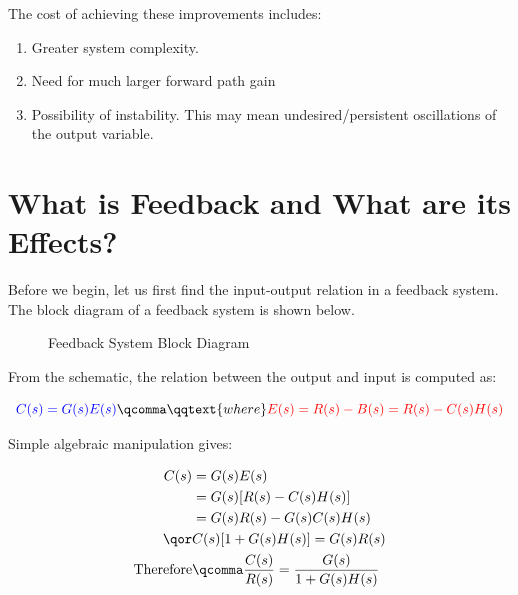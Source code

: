 \documentclass[
  14pt,
  a4paper,
  oneside,
  open=any,
  a4paper,
  14pt]{report}
\begin{document}
The cost of achieving these improvements includes:

\begin{enumerate}
\def\labelenumi{\alph{enumi}.}
\item
  Greater system complexity.
\item
  Need for much larger forward path gain
\item
  Possibility of instability. This may mean undesired/persistent
  oscillations of the output variable.
\end{enumerate}

\section{What is Feedback and What are its
Effects?}\label{what-is-feedback-and-what-are-its-effects}

Before we begin, let us first find the input-output relation in a
feedback system. The block diagram of a feedback system is shown below.

\begin{figure}[H]


\caption{\label{fig-feedback-diagram}Feedback System Block Diagram}

\end{figure}%

From the schematic, the relation between the output and input is
computed as:

\[
    \textcolor{blue}{C(s) = G(s)E(s)}\qcomma \qqtext{where} \textcolor{red}{E(s) = R(s) - B(s) = R(s) - C(s)H(s)}
\]

Simple algebraic manipulation gives:

\[
\begin{aligned}
    C(s) &= G(s)E(s) \\
    &= G(s)[R(s) - C(s)H(s)] \\
    &= G(s)R(s) - G(s)C(s)H(s) \\
    \qor& C(s)[1 + G(s)H(s)] = G(s)R(s) \\
    \text{Therefore} & \qcomma \dfrac{C(s)}{R(s)} = \dfrac{G(s)}{1+G(s)H(s)} 
\end{aligned}
\]
\end{document}
